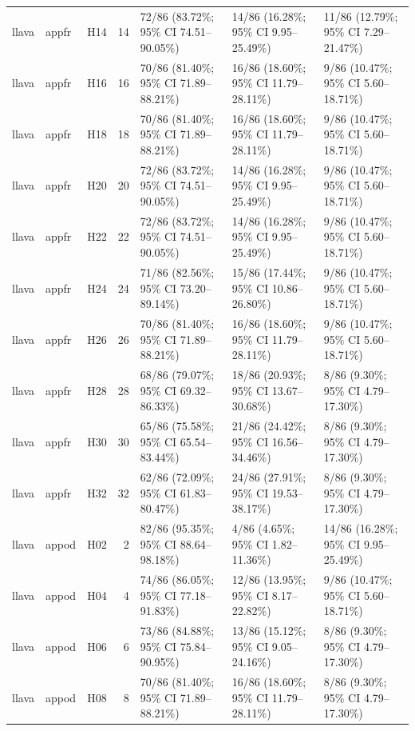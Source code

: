 \begin{longtable}{lllrlll}
llava & appfr & H14 & 14 & 72/86 (83.72\%; 95\% CI 74.51–90.05\%) & 14/86 (16.28\%; 95\% CI 9.95–25.49\%) & 11/86 (12.79\%; 95\% CI 7.29–21.47\%) \\
llava & appfr & H16 & 16 & 70/86 (81.40\%; 95\% CI 71.89–88.21\%) & 16/86 (18.60\%; 95\% CI 11.79–28.11\%) & 9/86 (10.47\%; 95\% CI 5.60–18.71\%) \\
llava & appfr & H18 & 18 & 70/86 (81.40\%; 95\% CI 71.89–88.21\%) & 16/86 (18.60\%; 95\% CI 11.79–28.11\%) & 9/86 (10.47\%; 95\% CI 5.60–18.71\%) \\
llava & appfr & H20 & 20 & 72/86 (83.72\%; 95\% CI 74.51–90.05\%) & 14/86 (16.28\%; 95\% CI 9.95–25.49\%) & 9/86 (10.47\%; 95\% CI 5.60–18.71\%) \\
llava & appfr & H22 & 22 & 72/86 (83.72\%; 95\% CI 74.51–90.05\%) & 14/86 (16.28\%; 95\% CI 9.95–25.49\%) & 9/86 (10.47\%; 95\% CI 5.60–18.71\%) \\
llava & appfr & H24 & 24 & 71/86 (82.56\%; 95\% CI 73.20–89.14\%) & 15/86 (17.44\%; 95\% CI 10.86–26.80\%) & 9/86 (10.47\%; 95\% CI 5.60–18.71\%) \\
llava & appfr & H26 & 26 & 70/86 (81.40\%; 95\% CI 71.89–88.21\%) & 16/86 (18.60\%; 95\% CI 11.79–28.11\%) & 9/86 (10.47\%; 95\% CI 5.60–18.71\%) \\
llava & appfr & H28 & 28 & 68/86 (79.07\%; 95\% CI 69.32–86.33\%) & 18/86 (20.93\%; 95\% CI 13.67–30.68\%) & 8/86 (9.30\%; 95\% CI 4.79–17.30\%) \\
llava & appfr & H30 & 30 & 65/86 (75.58\%; 95\% CI 65.54–83.44\%) & 21/86 (24.42\%; 95\% CI 16.56–34.46\%) & 8/86 (9.30\%; 95\% CI 4.79–17.30\%) \\
llava & appfr & H32 & 32 & 62/86 (72.09\%; 95\% CI 61.83–80.47\%) & 24/86 (27.91\%; 95\% CI 19.53–38.17\%) & 8/86 (9.30\%; 95\% CI 4.79–17.30\%) \\
llava & appod & H02 & 2 & 82/86 (95.35\%; 95\% CI 88.64–98.18\%) & 4/86 (4.65\%; 95\% CI 1.82–11.36\%) & 14/86 (16.28\%; 95\% CI 9.95–25.49\%) \\
llava & appod & H04 & 4 & 74/86 (86.05\%; 95\% CI 77.18–91.83\%) & 12/86 (13.95\%; 95\% CI 8.17–22.82\%) & 9/86 (10.47\%; 95\% CI 5.60–18.71\%) \\
llava & appod & H06 & 6 & 73/86 (84.88\%; 95\% CI 75.84–90.95\%) & 13/86 (15.12\%; 95\% CI 9.05–24.16\%) & 8/86 (9.30\%; 95\% CI 4.79–17.30\%) \\
llava & appod & H08 & 8 & 70/86 (81.40\%; 95\% CI 71.89–88.21\%) & 16/86 (18.60\%; 95\% CI 11.79–28.11\%) & 8/86 (9.30\%; 95\% CI 4.79–17.30\%) \\

\end{longtable}
